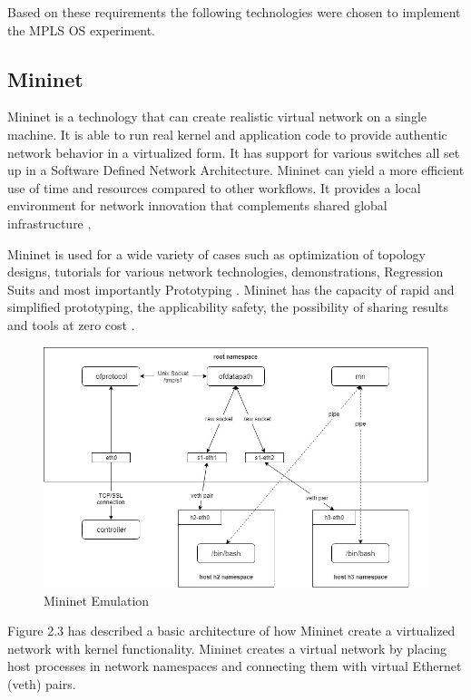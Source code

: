 Based on these requirements the following technologies were chosen to implement the MPLS OS experiment.

\subsection{Mininet}
Mininet is a technology that can create realistic virtual network on a single machine. It is able to run real kernel and application code to provide authentic network behavior in a virtualized form. It has support for various switches all set up in a Software Defined Network Architecture. Mininet can yield a more efficient use of time and resources compared to other workflows. It provides a local environment for network innovation that complements shared global infrastructure \cite{lantz2010network},

Mininet is used for a wide variety of cases such as optimization of topology designs, tutorials for various network technologies, demonstrations, Regression Suits and most importantly Prototyping \cite{lantz2010network}. Mininet has the capacity of rapid and simplified prototyping, the applicability safety, the possibility of sharing results and tools at zero cost \cite{de2014using}.

\begin{figure}[H]
       \centering\includegraphics[width=\textwidth]{images/7_Mininet_Emulation.jpg}
       \caption{Mininet Emulation}
       \label{fig:compbest}
\end{figure}

Figure 2.3 \cite{lantz2010network} has described a basic architecture of how Mininet create a virtualized network with kernel functionality. Mininet creates a virtual network by placing host processes in network namespaces and connecting them with virtual Ethernet (veth) pairs.


